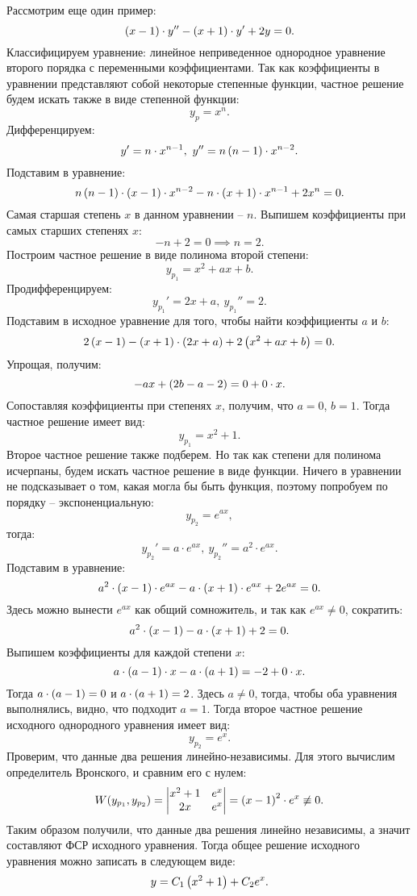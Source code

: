 		Рассмотрим еще один пример:
		\[ \left( x - 1 \right) \cdot y'' - \left( x + 1 \right) \cdot y' + 2y = 0. \]
		Классифицируем уравнение: линейное неприведенное однородное уравнение второго порядка с переменными коэффициентами. Так как коэффициенты в уравнении представляют собой некоторые степенные функции, частное решение будем искать также в виде степенной функции:
		\[ y_p = x^n. \]
		Дифференцируем:
		\[ y' = n \cdot x^{n-1}, ~ y'' = n \left( n-1 \right) \cdot x^{n-2}. \]
		Подставим в уравнение:
		\[ n\left( n - 1 \right) \cdot \left( x - 1 \right) \cdot x^{n-2} - n \cdot \left( x + 1 \right) \cdot x^{n-1} + 2 x^{n} = 0. \]
		Самая старшая степень $x$ в данном уравнении -- $n$. Выпишем коэффициенты при самых старших степенях $x$:
		\[ -n + 2 = 0 \implies n = 2. \]
		Построим частное решение в виде полинома второй степени:
		\[ y_{p_1} = x^2 + ax + b. \]
		Продифференцируем:
		\[ y_{p_1}' = 2x + a, ~ y_{p_1}'' = 2. \]
		Подставим в исходное уравнение для того, чтобы найти коэффициенты $a$ и $b$:
		\[ 2 \left( x - 1 \right) - \left( x + 1 \right) \cdot \left( 2x + a \right) + 2 \left( x^2 + ax + b \right) = 0. \]
		Упрощая, получим:
		\[ -ax + \left( 2b - a - 2 \right) = 0 + 0 \cdot x. \]
		Сопоставляя коэффициенты при степенях $x$, получим, что $a = 0$, $b = 1$. Тогда частное решение имеет вид:
		\[ y_{p_1} = x^2 + 1. \]
		Второе частное решение также подберем. Но так как степени для полинома исчерпаны, будем искать частное решение в виде функции. Ничего в уравнении не подсказывает о том, какая могла бы быть функция, поэтому попробуем по порядку -- экспоненциальную:
		\[ y_{p_2} = e^{ax}, \]
		тогда:
		\[ y_{p_2}' = a \cdot e^{ax}, ~ y_{p_2}'' = a^2 \cdot e^{ax}. \]
		Подставим в уравнение:
		\[ a^2 \cdot \left( x - 1 \right) \cdot e^{ax} - a \cdot \left( x + 1 \right) \cdot e^{ax} + 2e^{ax} = 0. \]
		Здесь можно вынести $e^{ax}$ как общий сомножитель, и так как $e^{ax} \neq 0$, сократить:
		\[ a^2 \cdot \left( x - 1 \right) - a \cdot \left( x + 1 \right) + 2 = 0. \]
		Выпишем коэффициенты для каждой степени $x$:
		\[ a \cdot \left( a - 1 \right) \cdot x - a \cdot \left( a + 1 \right) = -2 + 0 \cdot x. \]
		Тогда $a \cdot \left( a - 1 \right) = 0$ и $a \cdot \left( a + 1 \right) = 2$. Здесь $a \neq 0$, тогда, чтобы оба уравнения выполнялись, видно, что подходит $a = 1$. Тогда второе частное решение исходного однородного уравнения имеет вид:
		\[ y_{p_2} = e^{x}. \]
		Проверим, что данные два решения линейно-независимы. Для этого вычислим определитель Вронского, и сравним его с нулем:
		\[ W(y_{p_1}, y_{p_2}) = \begin{vmatrix}
			x^2 + 1 & e^{x} \\ 2x & e^x
		\end{vmatrix} = \left( x - 1 \right)^2 \cdot e^{x} \not\equiv 0. \]
		Таким образом получили, что данные два решения линейно независимы, а значит составляют ФСР исходного уравнения. Тогда общее решение исходного уравнения можно записать в следующем виде:
		\[ y = C_1 \left( x^2 + 1 \right) + C_2 e^{x}. \]

	\pagebreak